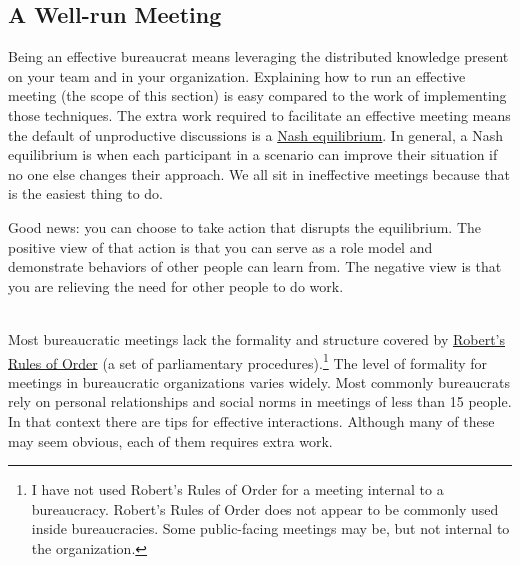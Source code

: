 \subsection*{A Well-run Meeting\label{sec:well-run-meeting}}

Being an effective bureaucrat means leveraging the distributed knowledge present on your team and in your organization.
Explaining how to run an effective meeting (the scope of this section) is easy compared to the work of implementing those techniques. 
The extra work required to facilitate an effective meeting means the default of unproductive discussions is a \href{https://en.wikipedia.org/wiki/Nash_equilibrium}{Nash equilibrium}. 
\iftoggle{WPinmargin}{\marginpar{$>$Wikipedia: Nash equilibrium}}{}
In general, a Nash equilibrium is when each participant in a scenario can improve their situation if no one else changes their approach. 
We all sit in ineffective meetings because that is the easiest thing to do. 

Good news: you can choose to take action that disrupts the equilibrium. The positive view of that action is that you can serve as a role model and demonstrate behaviors of other people can learn from. The negative view is that you are relieving the need for other people to do work.

\ \\

Most bureaucratic meetings lack the formality and structure  covered by \href{https://en.wikipedia.org/wiki/Robert\%27s_Rules_of_Order}{Robert's Rules of Order} (a set of parliamentary procedures).\footnote{I have not used Robert's Rules of Order for a meeting internal to a bureaucracy. Robert's Rules of Order does not appear to be commonly used inside bureaucracies. Some public-facing meetings may be, but not internal to the organization.} 
\iftoggle{WPinmargin}{\marginpar{$>$Wikipedia: Robert's Rules of Order}}{}
The level of formality for meetings in bureaucratic organizations varies widely. Most commonly bureaucrats rely on personal relationships and social norms in meetings of less than 15 people. In that context there are tips for effective interactions. Although many of these may seem obvious, each of them requires extra work. 

